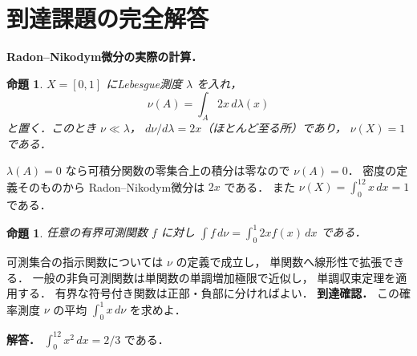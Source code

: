 \documentclass[a5paper,10pt,onecolumn]{jsarticle}
\makeatletter
\theoremstyle{mathnotetheorem}
\newtheorem{proposition}[theorem]{命題}
\renewcommand{\proofname}{証明}
\renewenvironment{proof}[1][\proofname]{%
  \par\pushQED{\qed}\normalfont\topsep4\p@\@plus2\p@\relax
  \trivlist\item[\hskip\labelsep\bfseries #1]\ignorespaces
}{\popQED\endtrivlist\@endpefalse}
\makeatother
\begin{document}
\section{到達課題の完全解答}
\noindent\textbf{Radon--Nikodym微分の実際の計算．}
\begin{proposition}
$X=[0,1]$ にLebesgue測度 $\lambda$ を入れ，
\[
\nu(A)=\int_A2x\,d\lambda(x)
\]
と置く．このとき $\nu\ll\lambda$，
$d\nu/d\lambda=2x$（ほとんど至る所）であり，
$\nu(X)=1$ である．
\end{proposition}
\begin{proof}
$\lambda(A)=0$ なら可積分関数の零集合上の積分は零なので
$\nu(A)=0$．
密度の定義そのものから
Radon--Nikodym微分は $2x$ である．
また $\nu(X)=\int_0^12x\,dx=1$ である．
\end{proof}
\begin{proposition}
任意の有界可測関数 $f$ に対し
$\int f\,d\nu=\int_0^1 2xf(x)\,dx$ である．
\end{proposition}
\begin{proof}
可測集合の指示関数については $\nu$ の定義で成立し，
単関数へ線形性で拡張できる．
一般の非負可測関数は単関数の単調増加極限で近似し，
単調収束定理を適用する．
有界な符号付き関数は正部・負部に分ければよい．
\end{proof}
\noindent\textbf{到達確認．}
この確率測度 $\nu$ の平均 $\int_0^1x\,d\nu$ を求めよ．
\par\noindent\textbf{解答．}
$\int_0^12x^2\,dx=2/3$ である．
\end{document}
